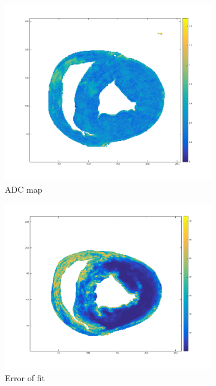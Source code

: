 \begin{figure}
    \begin{subfigure}{.31\textwidth}
        \includegraphics[width=\textwidth]{figures/pig4_adc_21}
        \caption{ADC map}
        \label{fig:pig4_adc}
    \end{subfigure}
    \begin{subfigure}{.31\textwidth}
        \includegraphics[width=\textwidth]{figures/pig4_err_21}
        \caption{Error of fit}
        \label{fig:pig4_err}
    \end{subfigure}
    \begin{subfigure}{.31\textwidth}

\end{subfigure}
\end{figure}
